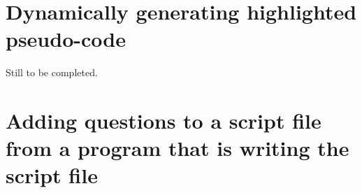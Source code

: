 \documentclass[12pt]{article}
\begin{document}
% 
% 
% 
% 



\section{Dynamically generating highlighted pseudo-code}
\label{pseudocode-win}
Still to be completed.

\section{Adding questions to a script file from a program that is writing the script file}
\end{document}
